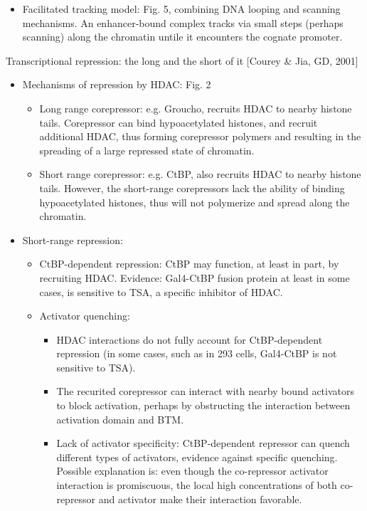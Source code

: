 \documentclass{report}
\begin{document}
\begin{itemize}
	\item Facilitated tracking model: Fig. 5, combining DNA looping and scanning mechanisms. An enhancer-bound complex tracks via small steps (perhaps scanning) along the chromatin untile it encounters the cognate promoter. 
\end{itemize}

Transcriptional repression: the long and the short of it [Courey \& Jia, GD, 2001]
\begin{itemize}
	\item Mechanisms of repression by HDAC: Fig. 2
	\begin{itemize}
		\item Long range corepressor: e.g. Groucho, recruits HDAC to nearby histone tails. Corepressor can bind hypoacetylated histones, and recruit additional HDAC, thus forming corepressor polymers and resulting in the spreading of a large repressed state of chromatin. 
		\item Short range corepressor: e.g. CtBP, also recruits HDAC to nearby histone tails. However, the short-range corepressors lack the ability of binding hypoacetylated histones, thus will not polymerize and spread along the chromatin. 
	\end{itemize}
	
	\item Short-range repression: 
	\begin{itemize}
		\item CtBP-dependent repression: CtBP may function, at least in part, by recruiting HDAC. Evidence: Gal4-CtBP fusion protein at least in some cases, is sensitive to TSA, a specific inhibitor of HDAC. 
		\item Activator quenching: 
		\begin{itemize}
			\item HDAC interactions do not fully account for CtBP-dependent repression (in some cases, such as in 293 cells, Gal4-CtBP is not sensitive to TSA). 
			\item The recurited corepressor can interact with nearby bound activators to block activation, perhaps by obstructing the interaction between activation domain and BTM. 
			\item Lack of activator specificity: CtBP-dependent repressor can quench different types of activators, evidence against specific quenching. Possible explanation is: even though the co-repressor activator interaction is promiscuous, the local high concentrations of both co-repressor and activator make their interaction favorable. 
		\end{itemize}
	\end{itemize}
\end{itemize}
\end{document}
